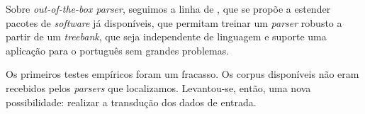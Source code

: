 Sobre \textit{out-of-the-box parser}, seguimos a linha de , que se propõe a estender pacotes de \textit{software} já disponíveis, que permitam treinar um \textit{parser} robusto a partir de um \textit{treebank}, que seja independente de linguagem e suporte uma aplicação para o português sem grandes problemas.



Os primeiros testes empíricos foram um fracasso. Os corpus disponíveis não eram recebidos pelos \textit{parsers} que localizamos. Levantou-se, então, uma nova possibilidade: realizar a transdução dos dados de entrada.  
    

